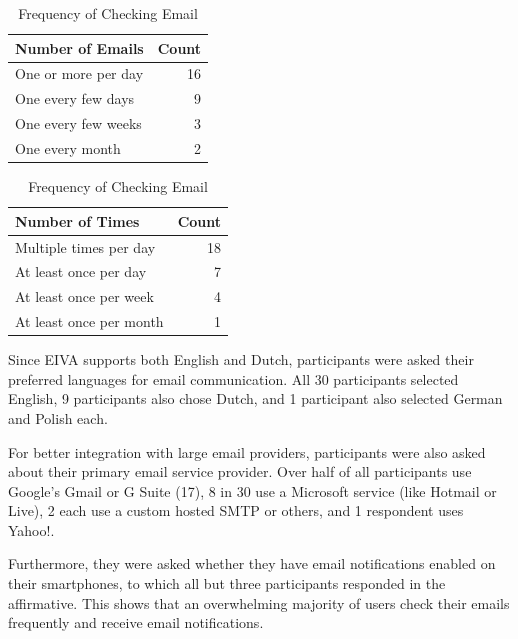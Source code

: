 \documentclass{article}
\begin{document}
\begin{table}[!htb]
	\begin{minipage}{.5\linewidth}
		\caption{Frequency of Emails Sent}
		\centering
		\begin{tabular}{lr}
			\hline
			\textbf{Number of Emails} & \textbf{Count} \\
			\hline
			One or more per day       & 16             \\
			One every few days        & 9              \\
			One every few weeks       & 3              \\
			One every month           & 2              \\
			\hline
		\end{tabular}
	\end{minipage}%
	\hspace{.1cm}
	\begin{minipage}{.5\linewidth}
		\centering
		\caption{Frequency of Checking Email}
		\begin{tabular}{lr}
			\hline
			\textbf{Number of Times} & \textbf{Count} \\
			\hline
			Multiple times per day   & 18             \\
			At least once per day    & 7              \\
			At least once per week   & 4              \\
			At least once per month  & 1              \\
			\hline
		\end{tabular}
	\end{minipage} 
\end{table}

Since EIVA supports both English and Dutch, participants were asked their preferred languages for email communication. All 30 participants selected English, 9 participants also chose Dutch, and 1 participant also selected German and Polish each.

For better integration with large email providers, participants were also asked about their primary email service provider. Over half of all participants use Google's Gmail or G Suite (17), 8 in 30 use a Microsoft service (like Hotmail or Live), 2 each use a custom hosted SMTP or others, and 1 respondent uses Yahoo!.

Furthermore, they were asked whether they have email notifications enabled on their smartphones, to which all but three participants responded in the affirmative. This shows that an overwhelming majority of users check their emails frequently and receive email notifications.
\end{document}
